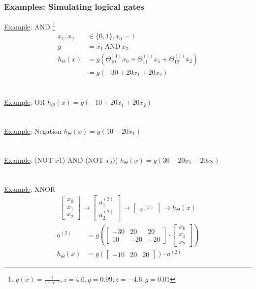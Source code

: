 \subsubsection{Examples: Simulating logical gates}
\underline{Example}: AND \footnote{$ g(x)=\frac{1}{1+e^{-z}}, z = 4.6, g = 0.99; z = -4.6, g = 0.01 $}\\
\begin{align*}
x_1, x_2 & \in \{0,1\}, x_0 = 1\\
y &= x_1~\text{AND}~x_2\\
h_\Theta(x) &= g(\Theta_{10}^{(1)}x_0 + \Theta_{11}^{(1)} x_1 + \Theta_{12}^{(1)}x_2)\\
&= g(-30 + 20x_1 +20x_2) 
\end{align*}
\\\\
\underline{Example}: OR \quad $h_\Theta(x) = g(-10 + 20x_1 +20x_2)$\\
\\\\
\underline{Example}: Negation \quad $h_\Theta(x) = g(10 - 20x_1)$\\
\\\\
\underline{Example}: (NOT $x1$) AND (NOT $x_2$)) \quad $h_\Theta(x) = g(30 - 20x_1- 20x_2)$\\
\\\\
\underline{Example}: XNOR
\begin{align*}
\begin{bmatrix} x_0\\x_1\\x_2 \end{bmatrix}
\rightarrow
\begin{bmatrix} a_1^{(2)}\\a_2^{(2)} \end{bmatrix} 
\rightarrow
\begin{bmatrix} a^{(3)}\end{bmatrix} 
\rightarrow
h_\Theta(x)
\end{align*}
\begin{align*}
a^{(2)} &= g(\begin{bmatrix}-30 & 20 & 20\\ 10 & -20 & -20\end{bmatrix} \cdot \begin{bmatrix} x_0\\ x_1\\ x_2 \end{bmatrix})\\
h_\Theta(x) &= g(\begin{bmatrix}-10 & 20 & 20\end{bmatrix}) \cdot a^{(2)}
\end{align*}

